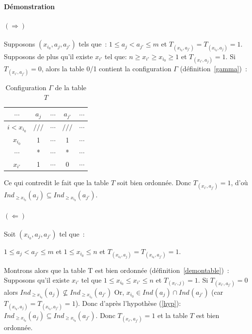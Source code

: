 \documentclass[a4paper]{report}
\renewcommand{\textbf}[1]{\begingroup\bfseries\mathversion{bold}#1\endgroup}
\newenvironment{preuve}{\textbf{Démonstration}}{}
\begin{document}
\begin{preuve}

\paragraph{$(\Rightarrow)$}
Supposons $(x_{i_0}, a_j, a_{j'})$ tels que~: $1 \leq a_j < a_{j'} \leq m$ et $T_{(x_{i_0}, a_{j'})} = T_{(x_{i_0}, a_j)} = 1$.
Supposons de plus qu'il existe $x_{i'}$ tel que:  $n \geqslant x_{i'}\geqslant x_{i_0} \geqslant 1$ et $T_{(x_{i'}, a_j)} = 1$.
Si $T_{(x_{i'}, a_{j'})} = 0$,
alors la table 0/1 contient la configuration $\Gamma$ (définition~\ref{gamma})~:
\begin{table}[htb]
\centering
 \begin{tabular}{*{4}{c|} c}
   $\cdots$ & $a_j$ & $\cdots$ & $a_{j'}$ & $\cdots$\\
 \hline   
   $i<x_{i_0}$ & $///$ & $\cdots$ & $///$ & $\cdots$\\
 \hline
   $x_{i_0}$ & 1 & $\cdots$ & 1 & $\cdots$\\
 \hline
   $\cdots$ & * & $\cdots$ & * & $\cdots$\\
 \hline
   $x_{i'}$ & 1 & $\cdots$ & 0 & $\cdots$
 \end{tabular}
\caption{Configuration $\Gamma$ de la table $T$}
\end{table}

Ce qui contredit le fait que la table $T$ soit bien ordonnée.
Donc $T_{(x_{i'}, a_{j'})} = 1$, 
d'où $Ind_{\geqslant x_{i_0}}(a_j) \subseteq Ind_{\geqslant x_{i_0}}(a_{j'})$.

\paragraph{$(\Leftarrow)$}
Soit $(x_{i_0}, a_j, a_{j'})$ tel que~:

 $1 \leq a_j < a_{j'} \leq m$ et $1 \leq x_{i_0} \leq n$ et $T_{(x_{i_0}, a_j)} = T_{(x_{i_0}, a_{j'})} =1$.

Montrons alors que la table T est bien ordonnée (définition~\ref{demontable})~:  
Supposons qu'il existe $x_{i'}$ tel que $1 \leq x_{i_0} \leq x_{i'} \leq n$ et $T_{(x_{i'}, j)} =1$.
Si $T_{(x_{i'}, a_{j'})} = 0$
alors 
$Ind_{\geqslant x_{i_0}}(a_j)  \not\subseteq Ind_{\geqslant x_{i_0}}(a_{j'})$
Or, $x_{i_0} \in Ind_{}(a_j) \cap Ind_{}(a_{j'})$  (car $T_{(x_{i_0}, a_j)} = T_{(x_{i_0}, a_{j'})} = 1$). 
Donc d'après l'hypothèse (\ref{hyp}): $Ind_{\geqslant x_{i_0}}(a_j) \subseteq Ind_{\geqslant x_{i_0}}(a_{j'})$. 
Donc $T_{(x_{i'}, a_{j'})} = 1$ et la table $T$ est bien ordonnée.
\begin{table}[htb]
  \centering


\end{table}
\end{preuve}
\end{document}
